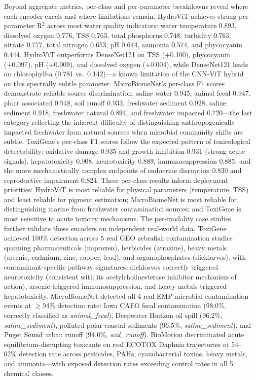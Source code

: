 \documentclass[12pt]{article}
\begin{document}
Beyond aggregate metrics, per-class and per-parameter breakdowns reveal where each encoder excels and where limitations remain. HydroViT achieves strong per-parameter R$^2$ across most water quality indicators: water temperature 0.893, dissolved oxygen 0.776, TSS 0.763, total phosphorus 0.748, turbidity 0.763, nitrate 0.777, total nitrogen 0.653, pH 0.644, ammonia 0.574, and phycocyanin 0.444. HydroViT outperforms DenseNet121 on TSS (+0.100), phycocyanin (+0.097), pH (+0.009), and dissolved oxygen (+0.004), while DenseNet121 leads on chlorophyll-a (0.781 vs.\ 0.142)---a known limitation of the CNN-ViT hybrid on this spectrally subtle parameter. MicroBiomeNet's per-class F1 scores demonstrate reliable source discrimination: saline water 0.945, animal fecal 0.947, plant associated 0.948, soil runoff 0.933, freshwater sediment 0.928, saline sediment 0.918, freshwater natural 0.894, and freshwater impacted 0.720---the last category reflecting the inherent difficulty of distinguishing anthropogenically impacted freshwater from natural sources when microbial community shifts are subtle. ToxiGene's per-class F1 scores follow the expected pattern of toxicological detectability: oxidative damage 0.935 and growth inhibition 0.931 (strong acute signals), hepatotoxicity 0.908, neurotoxicity 0.889, immunosuppression 0.885, and the more mechanistically complex endpoints of endocrine disruption 0.830 and reproductive impairment 0.824. These per-class results inform deployment priorities: HydroViT is most reliable for physical parameters (temperature, TSS) and least reliable for pigment estimation; MicroBiomeNet is most reliable for distinguishing marine from freshwater contamination sources; and ToxiGene is most sensitive to acute toxicity mechanisms. The per-modality case studies further validate these encoders on independent real-world data. ToxiGene achieved 100\% detection across 5 real GEO zebrafish contamination studies spanning pharmaceuticals (naproxen), herbicides (atrazine), heavy metals (arsenic, cadmium, zinc, copper, lead), and organophosphates (dichlorvos), with contaminant-specific pathway signatures: dichlorvos correctly triggered neurotoxicity (consistent with its acetylcholinesterase inhibitor mechanism of action), arsenic triggered immunosuppression, and heavy metals triggered hepatotoxicity. MicroBiomeNet detected all 4 real EMP microbial contamination events at $\geq$94\% detection rate: Iowa CAFO fecal contamination (98.0\%, correctly classified as \textit{animal\_fecal}), Deepwater Horizon oil spill (96.2\%, \textit{saline\_sediment}), polluted polar coastal sediments (96.5\%, \textit{saline\_sediment}), and Puget Sound urban runoff (94.0\%, \textit{soil\_runoff}). BioMotion discriminated acute equilibrium-disrupting toxicants on real ECOTOX Daphnia trajectories at 54--62\% detection rate across pesticides, PAHs, cyanobacterial toxins, heavy metals, and ammonia---with exposed detection rates exceeding control rates in all 5 chemical classes.
\end{document}
